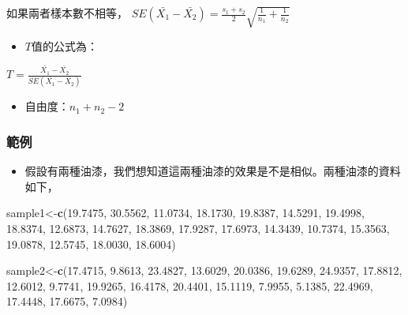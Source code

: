 \documentclass[hyperref,]{ctexart}
\newenvironment{Shaded}{\begin{snugshade}}{\end{snugshade}}
\newcommand{\FloatTok}[1]{\textcolor[rgb]{0.00,0.00,0.81}{#1}}
\newcommand{\KeywordTok}[1]{\textcolor[rgb]{0.13,0.29,0.53}{\textbf{#1}}}
\newcommand{\NormalTok}[1]{#1}
\providecommand{\tightlist}{%
  \setlength{\itemsep}{0pt}\setlength{\parskip}{0pt}}
\begin{document}
如果兩者樣本數不相等，
\(SE(\bar{X_{1}}-\bar{X_{2}})=\frac{s_{1}+s_{2}}{2}\sqrt{\frac{1}{n_{1}}+\frac{1}{n_{2}}}\)

\begin{itemize}
\tightlist
\item
  \(T\)值的公式為：
\end{itemize}

\(T=\frac{\bar{X_{1}}-\bar{X_{2}}}{SE(\bar{X_{1}}-\bar{X_{2}})}\)

\begin{itemize}
\tightlist
\item
  自由度：\(n_{1}+n_{2}-2\)
\end{itemize}

\hypertarget{ux7bc4ux4f8b-2}{%
\subsubsection{範例}\label{ux7bc4ux4f8b-2}}

\begin{itemize}
\tightlist
\item
  假設有兩種油漆，我們想知道這兩種油漆的效果是不是相似。兩種油漆的資料如下，
\end{itemize}

\begin{Shaded}
\begin{Highlighting}[]
\NormalTok{sample1<-}\KeywordTok{c}\NormalTok{(}\FloatTok{19.7475}\NormalTok{, }\FloatTok{30.5562}\NormalTok{, }\FloatTok{11.0734}\NormalTok{, }\FloatTok{18.1730}\NormalTok{, }\FloatTok{19.8387}\NormalTok{, }
           \FloatTok{14.5291}\NormalTok{, }\FloatTok{19.4998}\NormalTok{, }\FloatTok{18.8374}\NormalTok{, }\FloatTok{12.6873}\NormalTok{, }\FloatTok{14.7627}\NormalTok{,}
           \FloatTok{18.3869}\NormalTok{, }\FloatTok{17.9287}\NormalTok{, }\FloatTok{17.6973}\NormalTok{, }\FloatTok{14.3439}\NormalTok{, }\FloatTok{10.7374}\NormalTok{, }
           \FloatTok{15.3563}\NormalTok{, }\FloatTok{19.0878}\NormalTok{, }\FloatTok{12.5745}\NormalTok{, }\FloatTok{18.0030}\NormalTok{, }\FloatTok{18.6004}\NormalTok{)}

\NormalTok{sample2<-}\KeywordTok{c}\NormalTok{(}\FloatTok{17.4715}\NormalTok{, }\FloatTok{9.8613}\NormalTok{, }\FloatTok{23.4827}\NormalTok{, }\FloatTok{13.6029}\NormalTok{, }\FloatTok{20.0386}\NormalTok{, }
           \FloatTok{19.6289}\NormalTok{, }\FloatTok{24.9357}\NormalTok{, }\FloatTok{17.8812}\NormalTok{, }\FloatTok{12.6012}\NormalTok{, }\FloatTok{9.7741}\NormalTok{, }
           \FloatTok{19.9265}\NormalTok{, }\FloatTok{16.4178}\NormalTok{, }\FloatTok{20.4401}\NormalTok{, }\FloatTok{15.1119}\NormalTok{, }\FloatTok{7.9955}\NormalTok{,}
           \FloatTok{5.1385}\NormalTok{, }\FloatTok{22.4969}\NormalTok{, }\FloatTok{17.4448}\NormalTok{, }\FloatTok{17.6675}\NormalTok{, }\FloatTok{7.0984}\NormalTok{)}
\end{Highlighting}
\end{Shaded}
\end{document}
